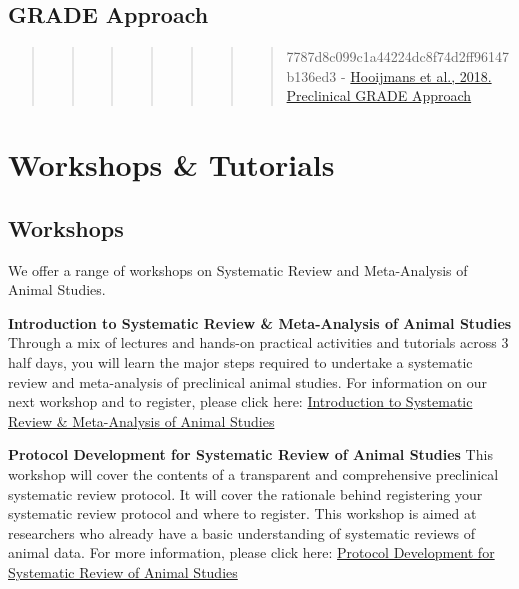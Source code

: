 \documentclass[
]{book}
\begin{document}
\hypertarget{grade-approach-1}{%
\section{GRADE Approach}\label{grade-approach-1}}

\begin{quote}
\begin{quote}
\begin{quote}
\begin{quote}
\begin{quote}
\begin{quote}
\begin{quote}
7787d8c099c1a44224dc8f74d2ff96147b136ed3
- \href{https://journals.plos.org/plosone/article?id=10.1371/journal.pone.0187271}{Hooijmans et al., 2018. Preclinical GRADE Approach}
\end{quote}
\end{quote}
\end{quote}
\end{quote}
\end{quote}
\end{quote}
\end{quote}

\hypertarget{workshops}{%
\chapter{Workshops \& Tutorials}\label{workshops}}

\hypertarget{workshops-1}{%
\section{Workshops}\label{workshops-1}}

We offer a range of workshops on Systematic Review and Meta-Analysis of Animal Studies.

\textbf{Introduction to Systematic Review \& Meta-Analysis of Animal Studies}
Through a mix of lectures and hands-on practical activities and tutorials across 3 half days, you will learn the major steps required to undertake a systematic review and meta-analysis of preclinical animal studies. For information on our next workshop and to register, please click here: \href{https://www.bihealth.org/en/translation/innovation-enabler/quest-center/mission-approaches/education-and-training/how-to-conduct-a-preclinical-animal-systematic-review-and-meta-analysi}{Introduction to Systematic Review \& Meta-Analysis of Animal Studies}

\textbf{Protocol Development for Systematic Review of Animal Studies}
This workshop will cover the contents of a transparent and comprehensive preclinical systematic review protocol. It will cover the rationale behind registering your systematic review protocol and where to register. This workshop is aimed at researchers who already have a basic understanding of systematic reviews of animal data. For more information, please click here: \href{https://www.bihealth.org/en/translation/innovation-enabler/quest-center/mission-approaches/education-and-training/protocol-development-for-systematic-review-of-animal-studies}{Protocol Development for Systematic Review of Animal Studies}
\end{document}
